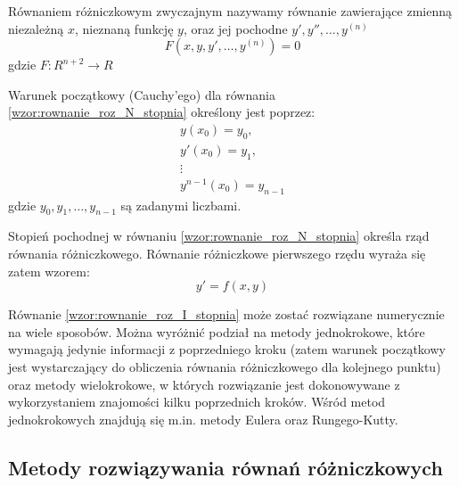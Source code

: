 Równaniem różniczkowym zwyczajnym nazywamy równanie zawierające zmienną niezależną $x$, nieznaną funkcję $y$, oraz jej pochodne $y', y'', \hdots, y^{(n)}$ \cite{BCh_2001}
\begin{equation}
	\label{wzor:rownanie_roz_N_stopnia}
	F(x,y,y',\hdots,y^{(n)}) = 0
\end{equation}
gdzie $F:R^{n+2} \rightarrow R$

Warunek początkowy (Cauchy'ego) dla równania \eqref{wzor:rownanie_roz_N_stopnia} określony jest poprzez: 
\begin{equation}
\begin{array}{c}
y(x_0)       =  y_0,     \\
y'(x_0)      =  y_1,     \\
\vdots			   	     \\
y^{n-1}(x_0) = y_{n-1}
\end{array}
\end{equation}
gdzie $y_0, y_1, \hdots, y_{n-1}$ są zadanymi liczbami.

Stopień pochodnej w równaniu \eqref{wzor:rownanie_roz_N_stopnia} określa rząd równania różniczkowego. Równanie różniczkowe pierwszego rzędu wyraża się zatem wzorem:
\begin{equation}
	\label{wzor:rownanie_roz_I_stopnia}
	y' = f(x,y)
\end{equation}

Równanie \eqref{wzor:rownanie_roz_I_stopnia} może zostać rozwiązane numerycznie na wiele sposobów. Można wyróżnić podział na metody jednokrokowe, które wymagają jedynie informacji z poprzedniego kroku (zatem warunek początkowy jest wystarczający do obliczenia równania różniczkowego dla kolejnego punktu) oraz metody wielokrokowe, w których rozwiązanie jest dokonowywane z wykorzystaniem znajomości kilku poprzednich kroków. Wśród metod jednokrokowych znajdują się m.in. metody Eulera oraz Rungego-Kutty.

\subsection{Metody rozwiązywania równań różniczkowych}

